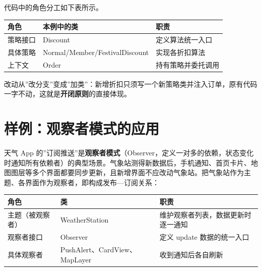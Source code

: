 \documentclass[12pt,a4paper,twoside,openany]{ctexbook}
\numberwithin{figure}{chapter}
\numberwithin{table}{chapter}
\newcounter{none}
\begin{document}
代码中的角色分工如下表所示。

{\def\LTcaptype{none} %
\begin{longtable}[]{@{}lll@{}}
\toprule\noalign{}
角色 & 本例中的类 & 职责 \\
\midrule\noalign{}
\endhead
\bottomrule\noalign{}
\endlastfoot
策略接口 & Discount & 定义算法统一入口 \\
具体策略 & Normal/Member/FestivalDiscount & 实现各折扣算法 \\
上下文 & Order & 持有策略并委托调用 \\
\end{longtable}
}

改动从''改分支''变成''加类''：新增折扣只须写一个新策略类并注入订单，原有代码一字不动，这就是\textbf{开闭原则}的直接体现。

\section{样例：观察者模式的应用}\label{ux6837ux4f8bux89c2ux5bdfux8005ux6a21ux5f0fux7684ux5e94ux7528}

天气 App
的''订阅推送''是\textbf{观察者模式}（Observer，定义一对多的依赖，状态变化时通知所有依赖者）的典型场景。气象站测得新数据后，手机通知、首页卡片、地图图层等多个界面都要同步更新，且新增界面不应改动气象站。把气象站作为主题、各界面作为观察者，即构成发布---订阅关系：

{\def\LTcaptype{none} %
\begin{longtable}[]{@{}
  >{\raggedright\arraybackslash}p{}
  >{\raggedright\arraybackslash}p{}
  >{\raggedright\arraybackslash}p{}@{}}
\toprule\noalign{}
\begin{minipage}[b]{\linewidth}\raggedright
角色
\end{minipage} & \begin{minipage}[b]{\linewidth}\raggedright
类
\end{minipage} & \begin{minipage}[b]{\linewidth}\raggedright
职责
\end{minipage} \\
\midrule\noalign{}
\endhead
\bottomrule\noalign{}
\endlastfoot
主题（被观察者） & WeatherStation &
维护观察者列表，数据更新时逐一通知 \\
观察者接口 & Observer & 定义 update 数据的统一入口 \\
具体观察者 & PushAlert、CardView、MapLayer & 收到通知后各自刷新 \\
\end{longtable}
}
\end{document}
